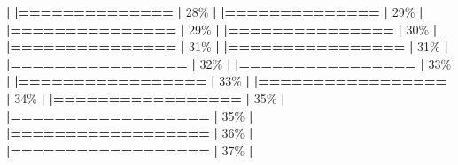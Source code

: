 \documentclass[
]{book}
\newenvironment{Shaded}{\begin{snugshade}}{\end{snugshade}}
\newcommand{\DecValTok}[1]{\textcolor[rgb]{0.00,0.00,0.81}{#1}}
\newcommand{\ErrorTok}[1]{\textcolor[rgb]{0.64,0.00,0.00}{\textbf{#1}}}
\newcommand{\NormalTok}[1]{#1}
\newcommand{\SpecialCharTok}[1]{\textcolor[rgb]{0.81,0.36,0.00}{\textbf{#1}}}
\begin{document}
\begin{Shaded}
\begin{Highlighting}[]
  \SpecialCharTok{|}                                                        
  \ErrorTok{|==============}                                    \ErrorTok{|}  \DecValTok{28}\NormalTok{\%}
  \SpecialCharTok{|}                                                        
  \ErrorTok{|==============}                                    \ErrorTok{|}  \DecValTok{29}\NormalTok{\%}
  \SpecialCharTok{|}                                                        
  \ErrorTok{|===============}                                   \ErrorTok{|}  \DecValTok{29}\NormalTok{\%}
  \SpecialCharTok{|}                                                        
  \ErrorTok{|===============}                                   \ErrorTok{|}  \DecValTok{30}\NormalTok{\%}
  \SpecialCharTok{|}                                                        
  \ErrorTok{|===============}                                   \ErrorTok{|}  \DecValTok{31}\NormalTok{\%}
  \SpecialCharTok{|}                                                        
  \ErrorTok{|================}                                  \ErrorTok{|}  \DecValTok{31}\NormalTok{\%}
  \SpecialCharTok{|}                                                        
  \ErrorTok{|================}                                  \ErrorTok{|}  \DecValTok{32}\NormalTok{\%}
  \SpecialCharTok{|}                                                        
  \ErrorTok{|================}                                  \ErrorTok{|}  \DecValTok{33}\NormalTok{\%}
  \SpecialCharTok{|}                                                        
  \ErrorTok{|=================}                                 \ErrorTok{|}  \DecValTok{33}\NormalTok{\%}
  \SpecialCharTok{|}                                                        
  \ErrorTok{|=================}                                 \ErrorTok{|}  \DecValTok{34}\NormalTok{\%}
  \SpecialCharTok{|}                                                        
  \ErrorTok{|=================}                                 \ErrorTok{|}  \DecValTok{35}\NormalTok{\%}
  \SpecialCharTok{|}                                                        
  \ErrorTok{|==================}                                \ErrorTok{|}  \DecValTok{35}\NormalTok{\%}
  \SpecialCharTok{|}                                                        
  \ErrorTok{|==================}                                \ErrorTok{|}  \DecValTok{36}\NormalTok{\%}
  \SpecialCharTok{|}                                                        
  \ErrorTok{|==================}                                \ErrorTok{|}  \DecValTok{37}\NormalTok{\%}
  \SpecialCharTok{|}                                                        

\end{Highlighting}
\end{Shaded}
\end{document}
